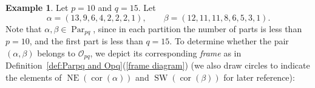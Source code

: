 \documentclass[noamsfonts,10pt]{amsart}
\newcommand{\al}{\alpha}
\newcommand{\be}{\beta}
\renewcommand{\O}{\mathcal{O}}
\newcommand{\NE}[1]{\operatorname{NE}(#1)}
\newcommand{\SW}[1]{\operatorname{SW}(#1)}
\DeclareMathOperator{\cor}{cor}
\DeclareMathOperator{\Par}{Par}
\newcommand{\1}{\mathbf{1}}
\theoremstyle{plain}
\theoremstyle{definition}
\newtheorem{example}[theorem]{Example}
\numberwithin{equation}{section}
\begin{document}
\begin{example}
    \label{ex:big example}
    Let $p = 10$ and $q = 15$.
    Let
    \[
        \al = (13,9,6,4,2,2,2,1), 
        \qquad
        \be = (12,11,11,8,6,5,3,1).
    \]
    Note that $\al,\be \in \Par_{pq}$, since in each partition the number of parts is less than $p=10$, and the first part is less than $q = 15$.
    To determine whether the pair $(\al,\be)$ belongs to $\O_{pq}$, we depict its corresponding \emph{frame} as in Definition~\ref{def:Parpq and Opq}(\ref{frame diagram}) (we also draw circles to indicate the elements of $\NE{\cor(\al)}$ and $\SW{\cor(\be)}$ for later reference):
    \begin{equation}
        \label{frame in example}
        
    \end{equation}


\end{example}
\end{document}
